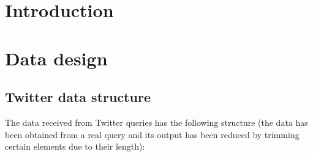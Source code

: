 
\section{Introduction}

\section{Data design}

\subsection{Twitter data structure}
\nonzeroparskip The data received from Twitter queries has the following structure (the data has been obtained from a real query and its output has been reduced by trimming certain elements due to their length):

